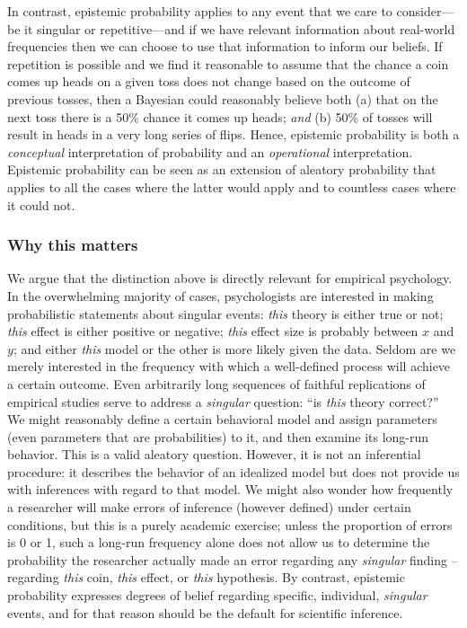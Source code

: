 In contrast, epistemic probability applies to any event that we care to consider---be it singular or repetitive---and if we have relevant information about real-world frequencies then we can choose to use that information to inform our beliefs. If repetition is possible and we find it reasonable to assume that the chance a coin comes up heads on a given toss does not change based on the outcome of previous tosses, then a Bayesian could reasonably believe both (a) that on the next toss there is a 50\% chance it comes up heads; \textit{and} (b) 50\% of tosses will result in heads in a very long series of flips. Hence, epistemic probability is both a \textit{conceptual} interpretation of probability and an \textit{operational} interpretation. Epistemic probability can be seen as an extension of aleatory probability that applies to all the cases where the latter would apply and to countless cases where it could not.

\subsubsection*{Why this matters} We argue that the distinction above is directly relevant for empirical psychology.  In the overwhelming majority of cases, psychologists are interested in making probabilistic statements about singular events: \emph{this} theory is either true or not; \textit{this} effect is either positive or negative; \textit{this} effect size is probably between $x$ and $y$; and either \textit{this} model or the other is more likely given the data. Seldom are we merely interested in the frequency with which a well-defined process will achieve a certain outcome. Even arbitrarily long sequences of faithful replications of empirical studies serve to address a \emph{singular} question: ``is \emph{this} theory correct?'' We might reasonably define a certain behavioral model and assign parameters (even parameters that are probabilities) to it, and then examine its long-run behavior.  This is a valid aleatory question.  However, it is not an inferential procedure: it describes the behavior of an idealized model but does not provide us with inferences with regard to that model.  We might also wonder how frequently a researcher will make errors of inference (however defined) under certain conditions, but this is a purely academic exercise; unless the proportion of errors is 0 or 1, such a long-run frequency alone does not allow us to determine the probability the researcher actually made an error regarding any \emph{singular} finding -- regarding \textit{this} coin, \textit{this} effect, or \textit{this} hypothesis. By contrast, epistemic probability expresses degrees of belief regarding specific, individual, \emph{singular} events, and for that reason should be the default for scientific inference.

